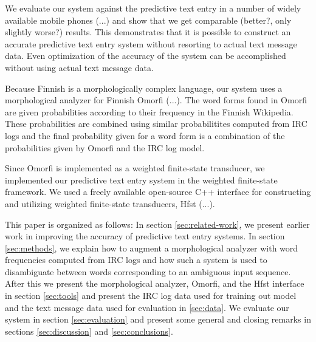 \documentclass[a4paper,conference]{IEEEtran}
\begin{document}
We evaluate our system against the predictive text entry in a number
of widely available mobile phones (...) and show that we get
comparable (better?, only slightly worse?) results. This demonstrates
that it is possible to construct an accurate predictive text entry
system without resorting to actual text message data. Even
optimization of the accuracy of the system can be accomplished without
using actual text message data.

Because Finnish is a morphologically complex language, our system uses
a morphological analyzer for Finnish Omorfi (...). The word forms
found in Omorfi are given probabilities according to their frequency
in the Finnish Wikipedia. These probabilities are combined using
similar probabilitites computed from IRC logs and the final
probability given for a word form is a combination of the probabilities
given by Omorfi and the IRC log model.

Since Omorfi is implemented as a weighted finite-state transducer, we
implemented our predictive text entry system in the weighted
finite-state framework. We used a freely available open-source C++
interface for constructing and utilizing weighted finite-state transducers,
Hfst (...).

This paper is organized as follows: In section \ref{sec:related-work},
we present earlier work in improving the accuracy of predictive text
entry systems. In section \ref{sec:methods}, we explain how to augment
a morphological analyzer with word frequencies computed from IRC logs
and how such a system is used to disambiguate between words
corresponding to an ambiguous input sequence. After this we present
the morphological analyzer, Omorfi, and the Hfst interface in section
\ref{sec:tools} and present the IRC log data used for training out model
and the text message data used for evaluation in \ref{sec:data}. We
evaluate our system in section \ref{sec:evaluation} and present some
general and closing remarks in sections \ref{sec:discussion} and
\ref{sec:conclusions}.

\end{document}
